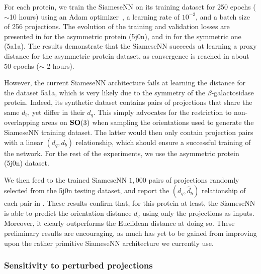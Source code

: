 For each protein, we train the SiameseNN on its training dataset for 250 epochs ($\sim$10 hours) using an Adam optimizer~\cite{kingma2014adam}, a learning rate of $10^{-3}$, and a batch size of 256 projections.
The evolution of the training and validation losses are presented in  for the asymmetric protein (5j0n), and in  for the symmetric one (5a1a).
The results demonstrate that the SiameseNN succeeds at learning a proxy distance for the asymmetric protein dataset, as convergence is reached in about 50 epochs ($\sim$ 2 hours).

However, the current SiameseNN architecture fails at learning the distance for the dataset 5a1a, which is very likely due to the symmetry of the $\beta$-galactosidase protein.
Indeed, its synthetic dataset contains pairs of projections that share the same $d_b$, yet differ in their $d_q$.
This simply advocates for the restriction to non-overlapping areas on $\mathrm{\mathbf{SO}}(3)$ when sampling the orientations used to generate the SiameseNN training dataset.
The latter would then only contain projection pairs with a linear $(d_q,d_b)$ relationship, which should ensure a successful training of the network.
For the rest of the experiments, we use the asymmetric protein (5j0n) dataset.

We then feed to the trained SiameseNN $1,000$ pairs of projections randomly selected from the 5j0n testing dataset, and report the $(d_q,\widehat{d}_b)$ relationship of each pair in .
These results confirm that, for this protein at least, the SiameseNN is able to predict the orientation distance $d_q$ using only the projections as inputs.
Moreover, it clearly outperforms the Euclidean distance at doing so.
These preliminary results are encouraging, as much has yet to be gained from improving upon the rather primitive SiameseNN architecture we currently use.

\subsubsection{Sensitivity to perturbed projections}\label{sec:results:distance-estimation:sensitivity}


